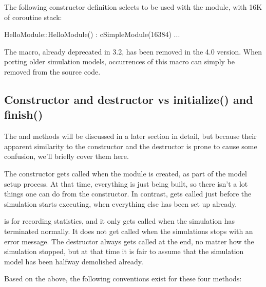 The following constructor definition selects  to be used
with the module, with 16K of coroutine stack:

\begin{cpp}
HelloModule::HelloModule() : cSimpleModule(16384) {...}
\end{cpp}

\begin{note}
    The  macro, already deprecated in {\opp} 3.2,
    has been removed in the 4.0 version. When porting older simulation models,
    occurrences of this macro can simply be removed from the source code.
\end{note}



\subsection{Constructor and destructor vs initialize() and finish()}
\label{sec:simple-modules:ctor-dtor-init-finish}

The  and  methods will be discussed
in a later section in detail, but because their apparent similarity
to the constructor and the destructor is prone to cause some confusion,
we'll briefly cover them here.

The constructor gets called when the module is created, as part of the
model setup process. At that time, everything is just being built,
so there isn't a lot things one can do from the constructor.
In contrast,  gets called just before the
simulation starts executing, when everything else has been set up
already.

 is for recording statistics, and it only gets called
when the simulation has terminated normally. It does not get called when
the simulations stops with an error message. The destructor always
gets called at the end, no matter how the simulation stopped, but
at that time it is fair to assume that the simulation model has been
halfway demolished already.

Based on the above, the following conventions exist for these four methods:

